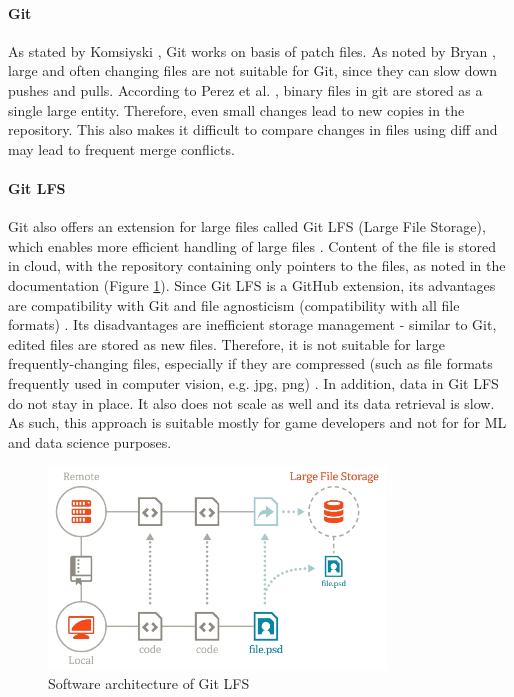 \paragraph{Git}
As stated by Komsiyski \cite{komsiyski2013binary}, Git works on basis of patch
files. As noted by Bryan \cite{bryan2018excuse}, large and often changing files
are not suitable for Git, since they can slow down pushes and pulls. According
to Perez et al. \cite{perez2016ten}, binary files in git are stored as a single
large entity. Therefore, even small changes lead to new copies in the
repository. This also makes it difficult to compare changes in files using diff
and may lead to frequent merge conflicts.

\paragraph{Git LFS}
Git also offers an extension for large files called Git LFS (Large File
Storage), which enables more efficient handling of large files
\cite{perez2016ten}. Content of the file is stored in cloud, with the repository
containing only pointers to the files, as noted in the documentation
\cite{gitlfs-structure} (Figure \ref{fig:gitlfs-architecture}). Since Git LFS is
a GitHub extension, its advantages are compatibility with Git
\cite{gitlfs-collaboration} and file agnosticism (compatibility with all file
formats) \cite{comparison}. Its disadvantages are inefficient storage management
- similar to Git, edited files are stored as new files. Therefore, it is not
suitable for large frequently-changing files, especially if they are compressed
(such as file formats frequently used in computer vision, e.g. jpg, png)
\cite{git-lfs}. In addition, data in Git LFS do not stay in place. It also does
not scale as well and its data retrieval is slow. As such, this approach is
suitable mostly for game developers and not for for ML and data science
purposes.

\begin{figure}[H]
    \centering
    \includegraphics[width=0.8\textwidth]{fig/gitlfs-arch.png}
    \caption{Software architecture of Git LFS \cite{gitlfs-architecture}}
    \label{fig:gitlfs-architecture}
\end{figure}

